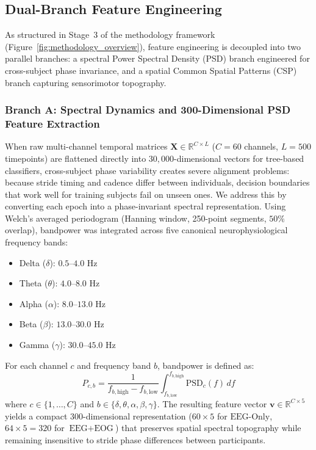\documentclass[11pt,a4paper]{article}
\begin{document}
\subsection{Dual-Branch Feature Engineering}
\label{sec:feature_engineering}

As structured in Stage~3 of the methodology framework (Figure~\ref{fig:methodology_overview}), feature engineering is decoupled into two parallel branches: a spectral Power Spectral Density (PSD) branch engineered for cross-subject phase invariance, and a spatial Common Spatial Patterns (CSP) branch capturing sensorimotor topography.

\subsubsection{Branch A: Spectral Dynamics and 300-Dimensional PSD Feature Extraction}
When raw multi-channel temporal matrices $\mathbf{X} \in \mathbb{R}^{C \times L}$ ($C=60$ channels, $L=500$ timepoints) are flattened directly into $30{,}000$-dimensional vectors for tree-based classifiers, cross-subject phase variability creates severe alignment problems: because stride timing and cadence differ between individuals, decision boundaries that work well for training subjects fail on unseen ones. We address this by converting each epoch into a phase-invariant spectral representation. Using Welch's averaged periodogram (Hanning window, 250-point segments, $50\%$ overlap), bandpower was integrated across five canonical neurophysiological frequency bands:
\begin{itemize}
    \item Delta ($\delta$): $0.5\text{--}4.0\text{ Hz}$
    \item Theta ($\theta$): $4.0\text{--}8.0\text{ Hz}$
    \item Alpha ($\alpha$): $8.0\text{--}13.0\text{ Hz}$
    \item Beta ($\beta$): $13.0\text{--}30.0\text{ Hz}$
    \item Gamma ($\gamma$): $30.0\text{--}45.0\text{ Hz}$
\end{itemize}
For each channel $c$ and frequency band $b$, bandpower is defined as:
\begin{equation}
    P_{c, b} = \frac{1}{f_{b,\text{high}} - f_{b,\text{low}}} \int_{f_{b,\text{low}}}^{f_{b,\text{high}}} \text{PSD}_c(f) \, df
\end{equation}
where $c \in \{1, \dots, C\}$ and $b \in \{\delta, \theta, \alpha, \beta, \gamma\}$. The resulting feature vector $\mathbf{v} \in \mathbb{R}^{C \times 5}$ yields a compact $300$-dimensional representation ($60 \times 5$ for $\text{EEG-Only}$, $64 \times 5 = 320$ for $\text{EEG}+\text{EOG}$) that preserves spatial spectral topography while remaining insensitive to stride phase differences between participants.
\end{document}
